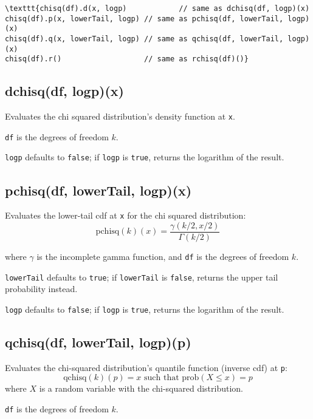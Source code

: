 \documentclass{article}
\begin{document}
\begin{lstlisting}
\texttt{chisq(df).d(x, logp)            // same as dchisq(df, logp)(x)
chisq(df).p(x, lowerTail, logp) // same as pchisq(df, lowerTail, logp)(x)
chisq(df).q(x, lowerTail, logp) // same as qchisq(df, lowerTail, logp)(x)
chisq(df).r()                   // same as rchisq(df)()}\end{lstlisting}

    \subsection*{dchisq(df, logp)(x)}
    Evaluates the chi squared distribution's density function at \texttt{x}.


\texttt{df} is the degrees of freedom $k$.


\texttt{logp} defaults to \texttt{false}; if \texttt{logp} is \texttt{true}, returns the
logarithm of the result.


    \subsection*{pchisq(df, lowerTail, logp)(x)}
    Evaluates the lower-tail cdf at \texttt{x} for the chi squared distribution:
$$\textrm{pchisq}(k)(x) = \frac{\gamma(k/2, x/2)}{\Gamma(k/2)}$$


where $\gamma$ is the incomplete gamma function, and
\texttt{df} is the degrees of freedom $k$.


\texttt{lowerTail} defaults to \texttt{true}; if \texttt{lowerTail} is \texttt{false}, returns
the upper tail probability instead.


\texttt{logp} defaults to \texttt{false}; if \texttt{logp} is \texttt{true}, returns the logarithm
of the result.


    \subsection*{qchisq(df, lowerTail, logp)(p)}
    Evaluates the chi-squared distribution's quantile function
(inverse cdf) at \texttt{p}:
$$\textrm{qchisq}(k)(p) = x \textrm{ such that } \textrm{prob}(X \leq x) = p$$
where $X$ is a random variable with the chi-squared distribution.


\texttt{df} is the degrees of freedom $k$.
\end{document}
